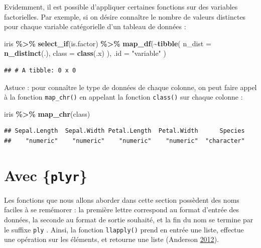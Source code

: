 \documentclass[
  11pt,
]{book}
\newenvironment{Shaded}{\begin{snugshade}}{\end{snugshade}}
\newcommand{\DataTypeTok}[1]{\textcolor[rgb]{0.13,0.29,0.53}{#1}}
\newcommand{\KeywordTok}[1]{\textcolor[rgb]{0.13,0.29,0.53}{\textbf{#1}}}
\newcommand{\NormalTok}[1]{#1}
\newcommand{\OperatorTok}[1]{\textcolor[rgb]{0.81,0.36,0.00}{\textbf{#1}}}
\newcommand{\StringTok}[1]{\textcolor[rgb]{0.31,0.60,0.02}{#1}}
\numberwithin{equation}{section}
\numberwithin{countremarque}{section}
\begin{document}
Evidemment, il est possible d'appliquer certaines fonctions sur des variables factorielles. Par exemple, si on désire connaître le nombre de valeurs distinctes pour chaque variable catégorielle d'un tableau de données :

\begin{Shaded}
\begin{Highlighting}[]
\NormalTok{iris }\OperatorTok{\%\textgreater{}\%}\StringTok{ }
\StringTok{  }\KeywordTok{select\_if}\NormalTok{(is.factor) }\OperatorTok{\%\textgreater{}\%}\StringTok{ }
\StringTok{  }\KeywordTok{map\_df}\NormalTok{(}\OperatorTok{\textasciitilde{}}\KeywordTok{tibble}\NormalTok{(}
    \DataTypeTok{n\_dist =} \KeywordTok{n\_distinct}\NormalTok{(.),}
    \DataTypeTok{class =} \KeywordTok{class}\NormalTok{(.x)}
\NormalTok{    ),}
  \DataTypeTok{.id =} \StringTok{"variable"}
\NormalTok{  )}
\end{Highlighting}
\end{Shaded}

\begin{lstlisting}
## # A tibble: 0 x 0
\end{lstlisting}

Astuce : pour connaître le type de données de chaque colonne, on peut faire appel à la fonction \texttt{map\_chr()} en appelant la fonction \texttt{class()} sur chaque colonne :

\begin{Shaded}
\begin{Highlighting}[]
\NormalTok{iris }\OperatorTok{\%\textgreater{}\%}\StringTok{ }\KeywordTok{map\_chr}\NormalTok{(class)}
\end{Highlighting}
\end{Shaded}

\begin{lstlisting}
## Sepal.Length  Sepal.Width Petal.Length  Petal.Width      Species 
##    "numeric"    "numeric"    "numeric"    "numeric"  "character"
\end{lstlisting}

\hypertarget{boucles_vectorisation_plyr}{%
\section{\texorpdfstring{Avec \{\texttt{plyr}\}}{Avec \{plyr\}}}\label{boucles_vectorisation_plyr}}

Les fonctions que nous allons aborder dans cette section possèdent des noms faciles à se remémorer : la première lettre correspond au format d'entrée des données, la seconde au format de sortie souhaité, et la fin du nom se termine par le suffixe \texttt{ply} . Ainsi, la fonction \texttt{llapply()} prend en entrée une liste, effectue une opération sur les éléments, et retourne une liste (Anderson \protect\hyperlink{ref-Anderson_2012_A_Quick}{2012}).
\end{document}
